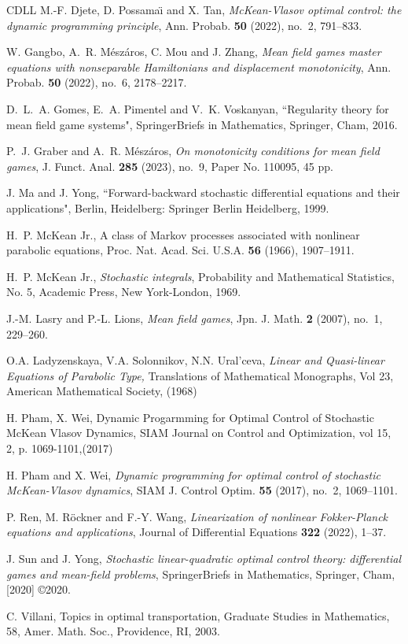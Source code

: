 \documentclass[11pt]{article}
\numberwithin{equation}{section}
\newcommand{\1}{\mbox{1\hspace{-1mm}I}}
\begin{document}
\begin{thebibliography}{CDLL}
 M.-F. Djete, D. Possama\"{\i} and X. Tan, \textit{Mc{K}ean-{V}lasov optimal control: the dynamic programming principle}, Ann. Probab. \textbf{50} (2022), no.~2, 791--833.

 W. Gangbo, A.~R. M\'esz\'aros, C. Mou and J. Zhang, \textit{Mean field games master equations with nonseparable Hamiltonians and displacement monotonicity}, Ann. Probab. \textbf{50} (2022), no.~6, 2178--2217.

 D.~L.~A. Gomes, E.~A. Pimentel and V.~K. Voskanyan,  ``Regularity theory for mean field game systems", SpringerBriefs in Mathematics, Springer, Cham, 2016.

 P.~J. Graber and A.~R. M\'esz\'aros, \textit{On monotonicity conditions for mean field games}, J. Funct. Anal. \textbf{285} (2023), no.~9, Paper No. 110095, 45 pp.

 J. Ma and J. Yong, ``Forward-backward stochastic differential equations and their applications", Berlin, Heidelberg: Springer Berlin Heidelberg, 1999.

 H.~P. McKean Jr., A class of Markov processes associated with nonlinear parabolic equations, Proc. Nat. Acad. Sci. U.S.A. {\bf 56} (1966), 1907--1911.

 H.~P. McKean Jr., {\it Stochastic integrals}, Probability and Mathematical Statistics, No. 5, Academic Press, New York-London, 1969.

 J.-M. Lasry and P.-L. Lions, \textit{Mean field games}, Jpn. J. Math. \textbf{2} (2007), no.~1, 229--260. %

 O.A. Ladyzenskaya, V.A. Solonnikov, N.N. Ural'ceva, \textit{Linear and Quasi-linear Equations of Parabolic Type, }Translations of Mathematical Monographs, Vol 23, American Mathematical Society, (1968)

 H. Pham, X. Wei, Dynamic Progarmming for Optimal Control of Stochastic McKean Vlasov Dynamics, SIAM Journal on Control and Optimization, vol 15, 2, p. 1069-1101,(2017)

 H. Pham and X. Wei, \textit{Dynamic programming for optimal control of stochastic {M}c{K}ean-{V}lasov dynamics}, SIAM J. Control Optim. \textbf{55} (2017), no.~2, 1069--1101. %

 P. Ren, M. R{\"o}ckner and F.-Y. Wang, \textit{Linearization of nonlinear Fokker-Planck equations and applications}, Journal of Differential Equations \textbf{322} (2022), 1--37.

 J. Sun and J. Yong, {\it Stochastic linear-quadratic optimal control theory: differential games and mean-field problems}, SpringerBriefs in Mathematics, Springer, Cham, [2020] \copyright 2020.

 C. Villani, Topics in optimal transportation, Graduate Studies in Mathematics, 58, Amer. Math. Soc., Providence, RI, 2003.






\end{thebibliography}



\end{document}
